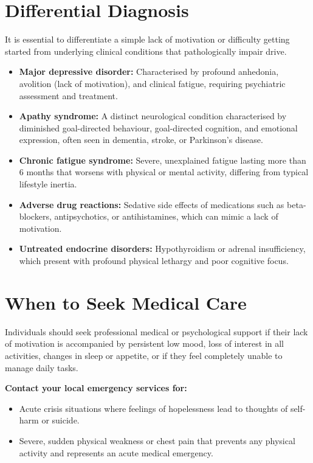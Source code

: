 \section*{Differential Diagnosis}
It is essential to differentiate a simple lack of motivation or difficulty getting started from underlying clinical conditions that pathologically impair drive.
\begin{itemize}
    \item \textbf{Major depressive disorder:} Characterised by profound anhedonia, avolition (lack of motivation), and clinical fatigue, requiring psychiatric assessment and treatment.
    \item \textbf{Apathy syndrome:} A distinct neurological condition characterised by diminished goal-directed behaviour, goal-directed cognition, and emotional expression, often seen in dementia, stroke, or Parkinson's disease.
    \item \textbf{Chronic fatigue syndrome:} Severe, unexplained fatigue lasting more than 6 months that worsens with physical or mental activity, differing from typical lifestyle inertia.
    \item \textbf{Adverse drug reactions:} Sedative side effects of medications such as beta-blockers, antipsychotics, or antihistamines, which can mimic a lack of motivation.
    \item \textbf{Untreated endocrine disorders:} Hypothyroidism or adrenal insufficiency, which present with profound physical lethargy and poor cognitive focus.
\end{itemize}

\section*{When to Seek Medical Care}
Individuals should seek professional medical or psychological support if their lack of motivation is accompanied by persistent low mood, loss of interest in all activities, changes in sleep or appetite, or if they feel completely unable to manage daily tasks.

\textbf{Contact your local emergency services for:}
\begin{itemize}
    \item Acute crisis situations where feelings of hopelessness lead to thoughts of self-harm or suicide.
    \item Severe, sudden physical weakness or chest pain that prevents any physical activity and represents an acute medical emergency.
\end{itemize}

